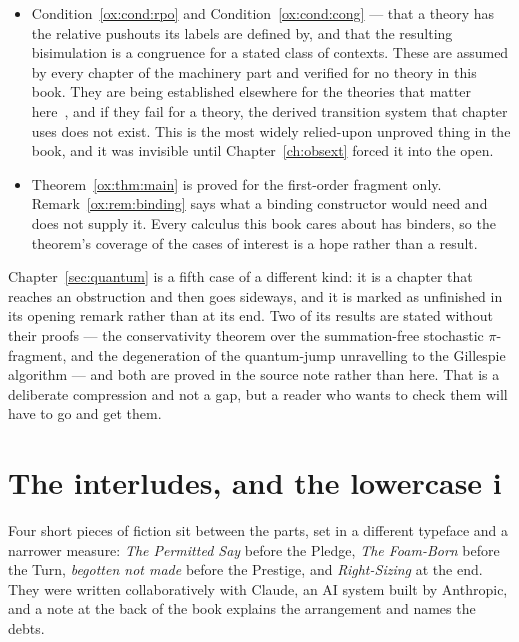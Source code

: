 \begin{itemize}[leftmargin=1.6em, itemsep=4pt]
      If it is not, compositionality does not transfer, and a
      good deal of the Prestige's construction goes with it.
\item Condition~\ref{ox:cond:rpo} and Condition~\ref{ox:cond:cong}
      --- that a theory has the relative pushouts its labels are
      defined by, and that the resulting bisimulation is a
      congruence for a stated class of contexts.
      These are assumed by every chapter of the machinery part and
      verified for no theory in this book.
      They are being established elsewhere for the theories that
      matter here~\cite{BIHOL}, and if they fail for a theory, the
      derived transition system that chapter uses does not exist.
      This is the most widely relied-upon unproved thing in the
      book, and it was invisible until Chapter~\ref{ch:obsext}
      forced it into the open.
\item Theorem~\ref{ox:thm:main} is proved for the first-order
      fragment only.
      Remark~\ref{ox:rem:binding} says what a binding constructor
      would need and does not supply it.
      Every calculus this book cares about has binders, so the
      theorem's coverage of the cases of interest is a hope rather
      than a result.
\end{itemize}

\noindent
Chapter~\ref{sec:quantum} is a fifth case of a different kind: it
is a chapter that reaches an obstruction and then goes sideways,
and it is marked as unfinished in its opening remark rather than at
its end.
Two of its results are stated without their proofs --- the
conservativity theorem over the summation-free stochastic
$\pi$-fragment, and the degeneration of the quantum-jump
unravelling to the Gillespie algorithm --- and both are proved in
the source note rather than here.
That is a deliberate compression and not a gap, but a reader who
wants to check them will have to go and get them.

\section*{The interludes, and the lowercase i}

Four short pieces of fiction sit between the parts, set in a
different typeface and a narrower measure: \emph{The Permitted Say}
before the Pledge, \emph{The Foam-Born} before the Turn,
\emph{begotten not made} before the Prestige, and
\emph{Right-Sizing} at the end.
They were written collaboratively with Claude, an AI system built
by Anthropic, and a note at the back of the book explains the
arrangement and names the debts.

